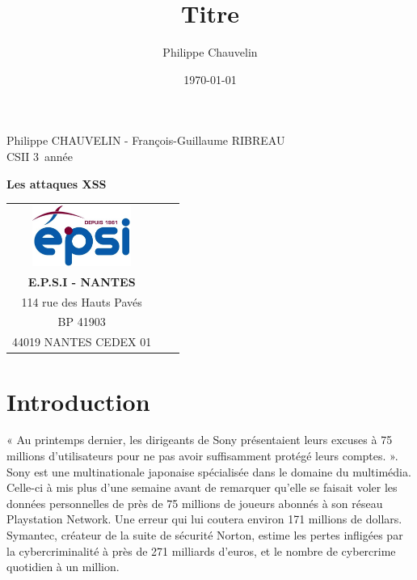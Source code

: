 \documentclass[a4paper,12pt]{report}
\title{Titre}
\author{Philippe Chauvelin}
\date{\today}
\begin{document}
	\begin{titlepage}
		\begin{center}
			Philippe CHAUVELIN - François-Guillaume RIBREAU\\
			CSII 3\ieme~année\\
		\end{center}
		\hrulefill
		\vspace{7cm}
		\begin{center} 
			\LARGE \textbf{Les attaques XSS}\\
			\vspace{6cm}
		
			\begin{tabular}{cp{4cm}c}
				\includegraphics[height=75px]{images/logo_epsi.jpg}\\
				\textbf{E.P.S.I - NANTES}\\
				114 rue des Hauts Pavés\\
				BP 41903\\
				44019 NANTES CEDEX 01\\
			\end{tabular}
		\end{center}
	\end{titlepage}
	\newpage
	
	\newpage
	\null
	\thispagestyle{empty}
	\setcounter{page}{0}
	\newpage
	
	
	\setcounter{page}{1}
	\thispagestyle{empty}
	\newpage
	
	\chapter*{Introduction} %
		\setcounter{section}{1}
		
		
« Au printemps dernier, les dirigeants de Sony présentaient leurs excuses à 75 millions d'utilisateurs pour ne pas avoir suffisamment protégé leurs comptes. ».\\

Sony est une multinationale japonaise spécialisée dans le domaine du multimédia. Celle-ci à mis plus d'une semaine avant de remarquer qu'elle se faisait voler les données personnelles de près de 75 millions de joueurs abonnés à son réseau Playstation Network. Une erreur qui lui coutera environ 171 millions de dollars. Symantec, créateur de la suite de sécurité Norton, estime les pertes infligées par la cybercriminalité à près de 271 milliards d'euros, et le nombre de cybercrime quotidien à un million.\\
\end{document}
